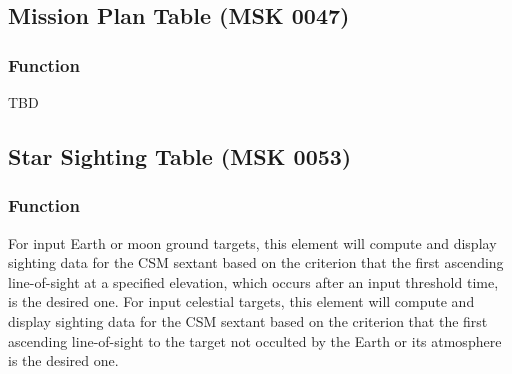 \documentclass[11pt]{article} %
\begin{document}
\subsection{Mission Plan Table (MSK 0047)}

\subsubsection{Function}
TBD
\newpage
\subsection{Star Sighting Table (MSK 0053)}
\subsubsection{Function}
For input Earth or moon ground targets, this element will compute and display sighting data for the CSM sextant based on the criterion that the first ascending line-of-sight at a specified elevation, which occurs after an input threshold time, is the desired one. For input celestial targets, this element will compute and display sighting data for the CSM sextant based on the criterion that the first ascending line-of-sight to the target not occulted by the Earth or its atmosphere is the desired one.
\end{document}

